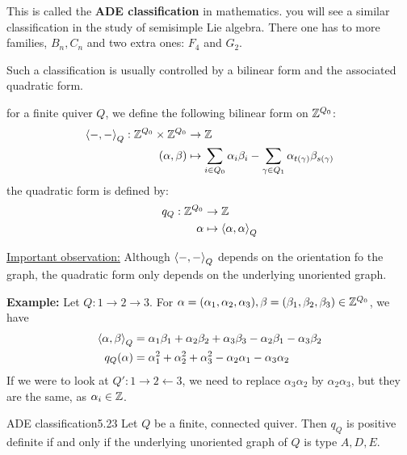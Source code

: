 \documentclass[twoside = false,	%
		headsepline,		%
		parskip = true,
		]{scrbook}						%
\begin{document}
    This is called the \textbf{ADE classification} in mathematics. you will see a similar classification in the study of semisimple Lie algebra. There one has to more families, $B_n,C_n$ and two extra ones: $F_4$ and $G_2$.

    Such a classification is usually controlled by a bilinear form and the associated quadratic form.

    for a finite quiver $Q$, we define the following bilinear form on $\mathbb Z^{Q_0}$:
    \begin{equation*}
    \begin{split}
        \left\langle -,-\right\rangle_Q: \mathbb Z^{Q_0} \times \mathbb Z^{Q_0} &\to \mathbb Z \\
                        (\alpha,\beta) &\mapsto \sum_{i \in Q_0} \alpha_i \beta_i - \sum_{\gamma \in Q_1} \alpha_{t(\gamma)} \beta_{s(\gamma)}
    \end{split}
    \end{equation*}
    the quadratic form is defined by:
    \begin{equation*}
    \begin{split}
        q_Q: \mathbb Z^{Q_0} &\to \mathbb Z \\
        \alpha &\mapsto \left\langle \alpha,\alpha\right\rangle_Q
    \end{split}
    \end{equation*}

    \underline{Important observation:}
    Although $\left\langle -,-\right\rangle_Q$ depends on the orientation fo the graph, the quadratic form only depends on the underlying unoriented graph.

    \textbf{Example:} Let $Q : 1 \to 2 \to 3$. For $\alpha = (\alpha_1,\alpha_2,\alpha_3), \beta = (\beta_1,\beta_2,\beta_3) \in \mathbb Z^{Q_0}$, we have
    \begin{equation*}
    \begin{split}
        \left\langle \alpha,\beta\right\rangle_Q &= \alpha_1 \beta_1 + \alpha_2 \beta_2 + \alpha_3 \beta_3 - \alpha_2 \beta_1 - \alpha_3 \beta_2 \\
        q_Q(\alpha) &= \alpha_1^2 + \alpha_2^2 + \alpha_3^2 - \alpha_2 \alpha_1 - \alpha_3 \alpha_2
    \end{split}
    \end{equation*}
    If we were to look at $Q' : 1 \to 2 \leftarrow 3$, we need to replace $\alpha_3 \alpha_2$ by $\alpha_2 \alpha_3$, but they are the same, as $\alpha_i \in \mathbb Z$.

    \begin{theorem}{ADE classification}{5.23}
        Let $Q$ be a finite, connected quiver. Then $q_Q$ is positive definite if and only if the underlying unoriented graph of $Q$ is type $A,D,E$.
    \end{theorem}
\end{document}
